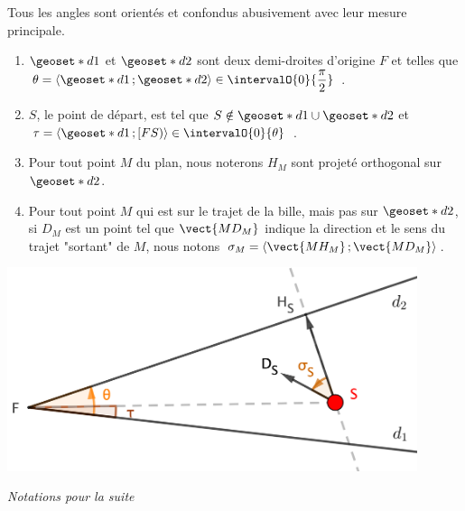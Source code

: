 Tous les angles sont orientés et confondus abusivement avec leur mesure principale.
\begin{enumerate}
	\item $\geoset*{d}{1}$ et $\geoset*{d}{2}$ sont deux demi-droites d'origine $F$ et telles que $\theta = \langle \geoset*{d}{1} \,; \geoset*{d}{2} \rangle \in \intervalO{0}{\dfrac{\pi}{2}}$ .

	\item $S$, le point de départ, est tel que $S \notin \geoset*{d}{1} \cup \geoset*{d}{2}$ et $\tau = \langle \geoset*{d}{1} \,; [FS) \rangle \in \intervalO{0}{\theta}$ .
	
	\item Pour tout point $M$ du plan, nous noterons $H_M$ sont projeté orthogonal sur $\geoset*{d}{2}$.
	
	\item Pour tout point $M$ qui est sur le trajet de la bille, mais pas sur $\geoset*{d}{2}$, si $D_M$ est un point tel que $\vect{MD_M}$ indique la direction et le sens du trajet "sortant" de $M$, nous notons $\sigma_M = \langle \vect{MH_M} \,; \vect{MD_M} \rangle$.
\end{enumerate}


\medskip


\begin{center}
	\includegraphics[width=12cm]{basic-math-pool/proof-notations.png}
	
	\itshape\small
	Notations pour la suite
\end{center}


